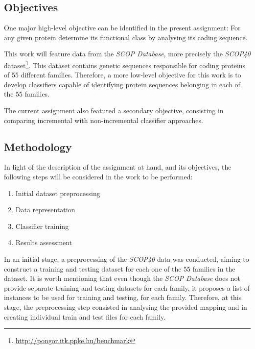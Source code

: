 \documentclass[11pt]{article}
\begin{document}
\subsection{Objectives}

One major high-level objective can be identified in the present assignment: For any given protein determine its functional class by analysing its coding sequence.

This work will feature data from the \emph{SCOP Database}\cite{murzin1995scop}, more precisely the \emph{SCOP40} dataset\footnote{\url{http://pongor.itk.ppke.hu/benchmark}}. This dataset contains genetic sequences responsible for coding proteins of 55 different families. Therefore, a more low-level objective for this work is to develop classifiers capable of identifying protein sequences belonging in each of the 55 families.

The current assignment also featured a secondary objective, consisting in comparing incremental with non-incremental classifier approaches. 

\subsection{Methodology}

In light of the description of the assignment at hand, and its objectives, the following steps will be considered in the work to be performed:

\begin{enumerate}
	\item Initial dataset preprocessing
	
	\item Data representation
	
	\item Classifier training
	
	\item Results assessment
\end{enumerate}

In an initial stage, a preprocessing of the \emph{SCOP40} data was conducted, aiming to construct a training and testing dataset for each one of the 55 families in the dataset. It is worth mentioning that even though the \emph{SCOP Database} does not provide separate training and testing datasets for each family, it proposes a list of instances to be used for training and testing, for each family. Therefore, at this stage, the preprocessing step consisted in analysing the provided mapping and in creating individual train and test files for each family.
\end{document}

